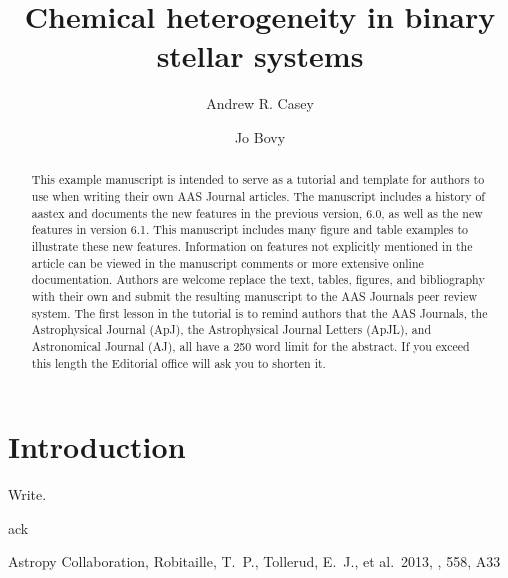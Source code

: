 \documentclass{aastex61}
\begin{document}
\title{Chemical heterogeneity in binary stellar systems}


\author[0000-0003-0174-0564]{Andrew R. Casey}

\author[0000-0001-6855-442X]{Jo Bovy}


\begin{abstract}
This example manuscript is intended to serve as a tutorial and template for
authors to use when writing their own AAS Journal articles. The manuscript
includes a history of aastex and documents the new features in the
previous version, 6.0, as well as the new features in version 6.1. This
manuscript includes many figure and table examples to illustrate these new
features.  Information on features not explicitly mentioned in the article
can be viewed in the manuscript comments or more extensive online
documentation. Authors are welcome replace the text, tables, figures, and
bibliography with their own and submit the resulting manuscript to the AAS
Journals peer review system.  The first lesson in the tutorial is to remind
authors that the AAS Journals, the Astrophysical Journal (ApJ), the
Astrophysical Journal Letters (ApJL), and Astronomical Journal (AJ), all
have a 250 word limit for the abstract.  If you exceed this length the
Editorial office will ask you to shorten it.
\end{abstract}

\keywords{}

\section{Introduction} 
\label{sec:introduction}
Write.


\acknowledgments

ack



\begin{thebibliography}{}

 Astropy Collaboration, Robitaille, T.~P., Tollerud, E.~J., et al.\ 2013, \aap, 558, A33 

\end{thebibliography}
\end{document}

